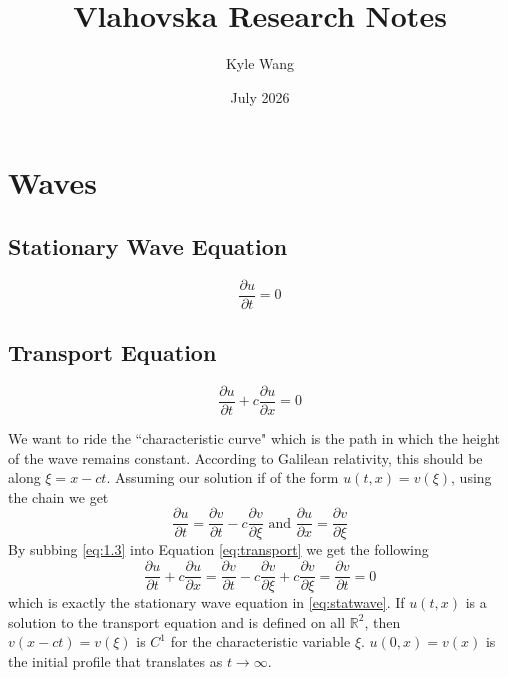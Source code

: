 \documentclass{article}
\title{Vlahovska Research Notes}
\author{Kyle Wang}
\date{July 2026}
\newcommand{\R}{\mathbb{R}}
\numberwithin{equation}{section}
\begin{document}
\maketitle

\tableofcontents 
\section{Waves}
\subsection{Stationary Wave Equation}
\begin{equation}
    \frac{\partial u}{\partial t} = 0 \label{eq:statwave}
\end{equation}

\subsection{Transport Equation}
\begin{equation}
    \frac{\partial u}{\partial t} + c\frac{\partial u}{\partial x} = 0 \label{eq:transport}
\end{equation}

We want to ride the ``characteristic curve" which is the path in which the height of the wave remains constant. According to Galilean relativity, this should be along $\xi = x-ct$. Assuming our solution if of the form $u(t,x) = v(\xi)$, using the chain we get 
\begin{equation}
    \frac{\partial u}{\partial t} = \frac{\partial v}{\partial t} - c\frac{\partial v}{\partial \xi} \text{ and } \frac{\partial u}{\partial x} = \frac{\partial v}{\partial \xi} \label{eq:1.3}
\end{equation}
By subbing \eqref{eq:1.3} into Equation \eqref{eq:transport} we get the following 
\begin{equation*}
    \frac{\partial u}{\partial t} + c\frac{\partial u}{\partial x} = \frac{\partial v}{\partial t} - c\frac{\partial v}{\partial \xi} + c\frac{\partial v}{\partial \xi} = \frac{\partial v}{\partial t} = 0
\end{equation*}
which is exactly the stationary wave equation in \eqref{eq:statwave}. If $u(t,x)$ is a solution to the transport equation and is defined on all $\R^2$, then $v(x-ct) = v(\xi)$ is $C^1$ for the characteristic variable $\xi$. $u(0,x) = v(x)$ is the initial profile that translates as $t \rightarrow \infty$. \\
\end{document}

